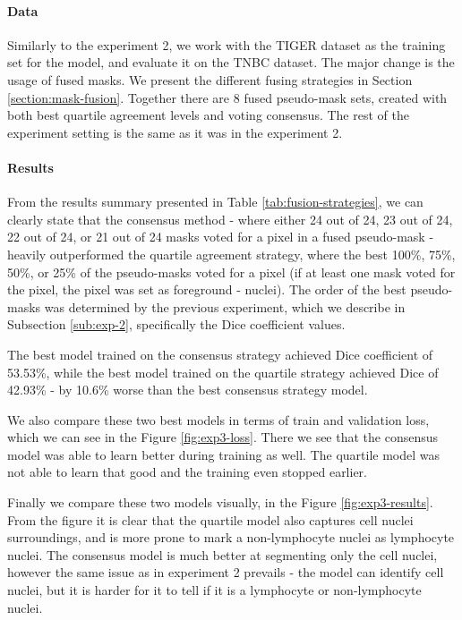 \paragraph{Data}
Similarly to the experiment 2, we work with the TIGER dataset as the training set for the model, and evaluate it on the TNBC dataset. The major change is the usage of fused masks. We present the different fusing strategies in Section \ref{section:mask-fusion}. Together there are 8 fused pseudo-mask sets, created with both best quartile agreement levels and voting consensus. The rest of the experiment setting is the same as it was in the experiment 2.

\paragraph{Results}
From the results summary presented in Table \ref{tab:fusion-strategies}, we can clearly state that the consensus method - where either 24 out of 24, 23 out of 24, 22 out of 24, or 21 out of 24 masks voted for a pixel in a fused pseudo-mask - heavily outperformed the quartile agreement strategy, where the best 100\%, 75\%, 50\%, or 25\% of the pseudo-masks voted for a pixel (if at least one mask voted for the pixel, the pixel was set as foreground - nuclei). The order of the best pseudo-masks was determined by the previous experiment, which we describe in Subsection \ref{sub:exp-2}, specifically the Dice coefficient values.

The best model trained on the consensus strategy achieved Dice coefficient of 53.53\%, while the best model trained on the quartile strategy achieved Dice of 42.93\% - by 10.6\% worse than the best consensus strategy model.

We also compare these two best models in terms of train and validation loss, which we can see in the Figure \ref{fig:exp3-loss}. There we see that the consensus model was able to learn better during training as well. The quartile model was not able to learn that good and the training even stopped earlier.

Finally we compare these two models visually, in the Figure \ref{fig:exp3-results}. From the figure it is clear that the quartile model also captures cell nuclei surroundings, and is more prone to mark a non-lymphocyte nuclei as lymphocyte nuclei. The consensus model is much better at segmenting only the cell nuclei, however the same issue as in experiment 2 prevails - the model can identify cell nuclei, but it is harder for it to tell if it is a lymphocyte or non-lymphocyte nuclei.

